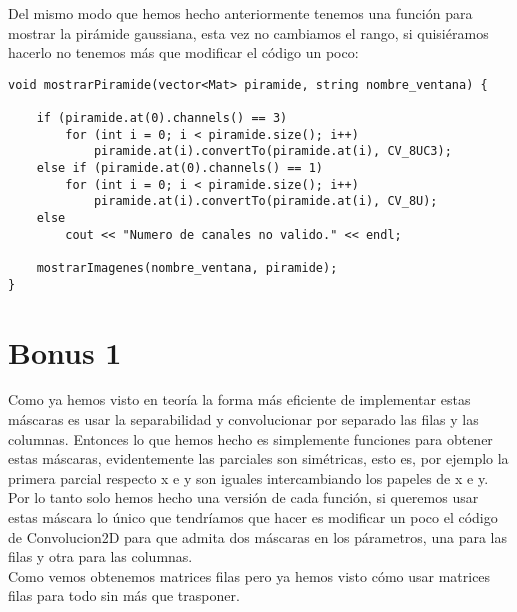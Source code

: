 \documentclass[10pt,a4paper]{article}
\begin{document}
Del mismo modo que hemos hecho anteriormente tenemos una función para mostrar la pirámide gaussiana, esta vez no cambiamos el rango, si quisiéramos hacerlo no tenemos más que modificar el código un poco:\\

\begin{lstlisting}
void mostrarPiramide(vector<Mat> piramide, string nombre_ventana) {

	if (piramide.at(0).channels() == 3)
		for (int i = 0; i < piramide.size(); i++)
			piramide.at(i).convertTo(piramide.at(i), CV_8UC3);
	else if (piramide.at(0).channels() == 1)
		for (int i = 0; i < piramide.size(); i++)
			piramide.at(i).convertTo(piramide.at(i), CV_8U);
	else
		cout << "Numero de canales no valido." << endl;

	mostrarImagenes(nombre_ventana, piramide);
}
\end{lstlisting}

\section*{Bonus 1}

Como ya hemos visto en teoría la forma más eficiente de implementar estas máscaras es usar la separabilidad y convolucionar por separado las filas y las columnas. Entonces lo que hemos hecho es simplemente funciones para obtener estas máscaras, evidentemente las parciales son simétricas, esto es, por ejemplo la primera parcial respecto x e y son iguales intercambiando los papeles de x e y.\\

Por lo tanto solo hemos hecho una versión de cada función, si queremos usar estas máscara lo único que tendríamos que hacer es modificar un poco el código de Convolucion2D para que admita dos máscaras en los párametros, una para las filas y otra para las columnas.\\

Como vemos obtenemos matrices filas pero ya hemos visto cómo usar matrices filas para todo sin más que trasponer.\\
\end{document}
